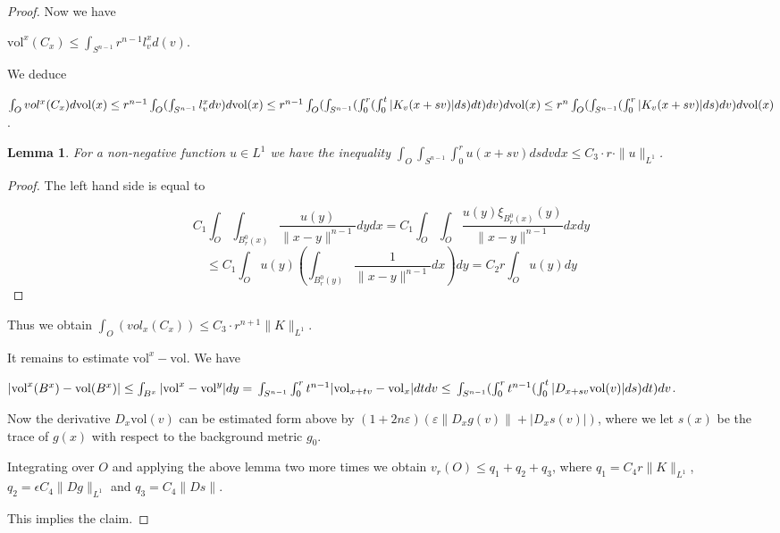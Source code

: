 \documentclass[12pt,leqno,intlimits]{amsart}
\numberwithin{equation}{section}
\newtheorem{lem}[thm]{Lemma}
\theoremstyle{definition}
\theoremstyle{remark}
\newcommand{\vol}{\mathrm{vol}}
\def\eps{\varepsilon}
\begin{document}
\begin{proof}
   Now we have

   $\vol ^x (C_x) \leq \int _{S^{n-1}} r^{n-1} l^x _v d(v) $.


    We deduce

    $\int _O vol ^x (C_x) d\vol (x) \leq r^{n-1} \int _O (\int _{S^{n-1}} l_v ^x dv) d\vol (x) \leq \\
    r^{n-1} \int _O (\int _{S^{n-1}} (\int _0 ^r (\int _0 ^t |K_v (x+sv)| ds)dt)dv)d\vol (x) \leq \\
    r^n \int _O (\int _{S^{n-1}} (\int _0 ^r |K_v (x+sv)| ds) dv)d\vol (x)$.


    \begin{lem}
    For a non-negative function $u\in L^1$ we have the inequality
    $\int _O \int _{S^{n-1}} \int _0^r u(x+sv) ds dv dx \leq C_3 \cdot r \cdot \|u\| _{L^1}$.
    \end{lem}


     \begin{proof}
     The left hand side is equal to

     \[
     C_1 \int _O \int_{B^0_r (x)} \frac {u(y)}  {\|x-y\| ^{n-1}} dy dx = C_1 \int _O \int _O \frac {u(y) \xi _{B^0_r (x)}(y)}
     {\|x-y\| ^{n-1}} dx dy 
     \]
     \[
    \le C_1 \int _O u(y)\left(\int _{B_r^0(y)}  \frac {1}
     {\|x-y\| ^{n-1}} dx\right)dy = C_2 r  \int _O u(y)dy
     \]
     \end{proof}


      Thus we obtain $\int _O (vol _x (C_x)) \leq C_3 \cdot r^{n+1} \|K\| _{L^1}$.


      It remains to estimate $\vol ^x - \vol$. We have

      $|\vol ^x (B^x) -\vol (B^x)| \leq \int _ {B^x} |\vol ^x -\vol ^y| dy = \\
      \int _{S^{n-1}} \int _0 ^r  t^{n-1} | \vol _{x+tv} - \vol _x| dt dv \leq  \\
       \int _{ S^{n-1}} (\int _0 ^r t^{n-1} (\int _0 ^t  |D_{x+sv} \vol (v)| ds) dt) dv$.

      Now the derivative $D_x \vol (v)$ can be estimated form above by $(1+2n\eps)(\eps \|D_xg (v)\| + | D_x s (v)|)$,
      where we let $s(x)$ be the trace of $g(x)$ with respect to the background metric $g_0$.

      Integrating over $O$ and applying the above lemma two more times we obtain
      $v_r (O) \leq q_1 +q_2 +q_3$, where
      $q_1 = C_4 r \|K\| _{L^1}$, $q_2 = \epsilon C_4 \| Dg\| _{L^1} $ and $q_3 = C_4 \|Ds\|$.

      This implies the claim.
    \end{proof}
\end{document}
